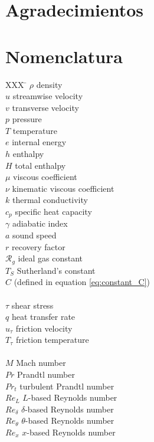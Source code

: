 \documentclass[a4paper,12pt]{book}
\begin{document}
\chapter*{Agradecimientos}





\clearpage
\tableofcontents
\clearpage
\chapter*{Nomenclatura}

\begin{multicols}{2}

\begin{tabbing}
 XXX \= \kill%
 $\rho$ \> density \\
 $u$ \> streamwise velocity\\
 $v$ \> transverse velocity\\
 $p$ \> pressure \\
 $T$ \> temperature \\
 $e$ \> internal energy\\
 $h$ \> enthalpy\\
 $H$ \> total enthalpy\\
 $\mu$ \> viscous coefficient \\
 $\nu$ \> kinematic viscous coefficient \\
 $k$ \> thermal conductivity \\
 $c_p$ \> specific heat capacity \\
 $\gamma$ \> adiabatic index\\
 $a$ \> sound speed\\
 $r$ \> recovery factor\\
 $\mathcal{R}_g$ \> ideal gas constant \\
 $T_S$ \> Sutherland's constant \\
 $C$ \> (defined in equation \eqref{eq:constant_C}) \\
 $ $ \>     \\

 $\tau$ \>  shear stress\\
 $q$ \> heat transfer rate\\
 $u_\tau$ \> friction velocity\\
 $T_\tau$ \> friction temperature\\
 $ $ \>     \\

 $M$ \> Mach number \\
 $Pr$ \> Prandtl number \\
 $Pr_t$ \> turbulent Prandtl number \\
 $Re_L$ \> $L$-based Reynolds number \\
 $Re_\delta$ \> $\delta$-based Reynolds number \\
 $Re_\theta$ \> $\theta$-based Reynolds number \\
 $Re_x$ \> $x$-based Reynolds number \\
 $ $ \>     \\


\end{tabbing}
\end{multicols}
\end{document}
